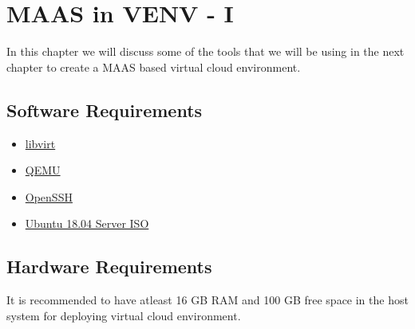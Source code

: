 \chapter{MAAS in VENV - I}

In this chapter we will discuss some of the tools that we will be using in the next chapter to create a MAAS based virtual cloud environment.

\section{Software Requirements}

\begin{itemize}
    \setlength\itemsep{-1em}
    \item \href{https://libvirt.org/}{libvirt}
    \item \href{https://www.qemu.org/}{QEMU}
    \item \href{https://www.openssh.com/}{OpenSSH}
    \item \href{http://releases.ubuntu.com/18.04.3/ubuntu-18.04.3-live-server-amd64.iso}{Ubuntu 18.04 Server ISO}
\end{itemize}
\section{Hardware Requirements}

It is recommended to have atleast 16 GB RAM and 100 GB free space in the host system for deploying virtual cloud environment.